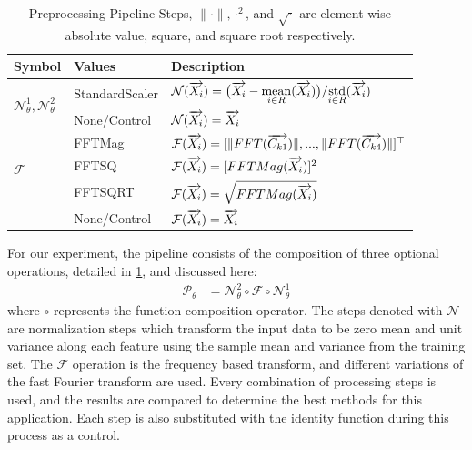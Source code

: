 \begin{table}[h]
\centering
\caption{Preprocessing Pipeline Steps, $\|\cdot\|, \cdot^2$, and $\sqrt{\cdot}$ are element-wise
 absolute value, square, and square root respectively.}
\label{tab:preproc}
{\renewcommand{\arraystretch}{1.5}%
\begin{tabular}{l|l|l}
Symbol                  & Values         & Description    \\ \hline 
\multirow{2}{*}{$\mathcal{N}_\theta^1, \mathcal{N}_\theta^2$} & StandardScaler 
   & $\mathcal{N}(\overrightarrow{X_i}) = \big(\overrightarrow{X_i} - \underset{i \in R}{\mathrm{mean}} (\overrightarrow{X_{i}}) \big)/ 
                                  \underset{i \in R}{\mathrm{std}}(\overrightarrow{X_{i}})$ \\
   & None/Control   & $\mathcal{N}(\overrightarrow{X_i}) = \overrightarrow{X_i}$   \\ \hline
\multirow{3}{*}{$\mathcal{F}$}      & FFTMag        
              & $\mathcal{F}(\overrightarrow{X_i}) = [\|FFT(\overrightarrow{C_{k1}})\|,  ..., \|FFT(\overrightarrow{C_{k4}})\|]^\top$     \\
              & FFTSQ        & $\mathcal{F}(\overrightarrow{X_i}) = [FFTMag(\overrightarrow{X_i})]^2 $         \\
              & FFTSQRT       & $\mathcal{F}(\overrightarrow{X_i}) = \sqrt{FFTMag(\overrightarrow{X_i})}$      \\
              & None/Control  & $\mathcal{F}(\overrightarrow{X_i}) = \overrightarrow{X_i}$           
\end{tabular}}
\end{table}

For our experiment, the pipeline consists of the composition of three optional operations, 
 detailed in \ref{tab:preproc}, and discussed here:
\begin{align}
\mathcal{P}_\theta &= \mathcal{N}_\theta^2 \circ \mathcal{F} \circ \mathcal{N}_\theta^1
\end{align}
where $\circ$ represents the function composition operator.
The steps denoted with $\mathcal{N}$ are normalization steps which transform the input
 data to be zero mean and unit variance along each feature using the sample mean and variance
 from the training set. 
The $\mathcal{F}$ operation is the frequency based transform, and different variations of 
 the fast Fourier transform are used. 
Every combination of processing steps is used, 
 and the results are compared to determine the best methods for this application. 
Each step is also substituted with the identity function during this process as a control.

